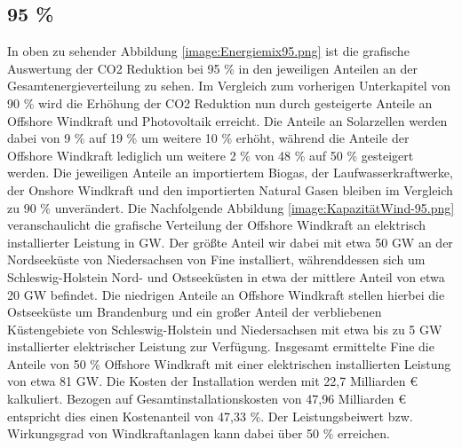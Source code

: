 \subsection{95 \%}


In oben zu sehender Abbildung \ref{image:Energiemix95.png} ist die grafische Auswertung der CO2 Reduktion bei 95 \% in den jeweiligen Anteilen an der Gesamtenergieverteilung zu sehen. Im Vergleich zum vorherigen Unterkapitel von 90 \% wird die Erhöhung der CO2 Reduktion nun durch gesteigerte Anteile an Offshore Windkraft und Photovoltaik erreicht. Die Anteile an Solarzellen werden dabei von 9 \% auf 19 \% um weitere 10 \% erhöht, während die Anteile der Offshore Windkraft lediglich um weitere 2 \% von 48 \% auf 50 \% gesteigert werden. Die jeweiligen Anteile an importiertem Biogas, der Laufwasserkraftwerke, der Onshore Windkraft und den importierten Natural Gasen bleiben im Vergleich zu 90 \% unverändert. 
Die Nachfolgende Abbildung \ref{image:KapazitätWind-95.png} veranschaulicht die grafische Verteilung der Offshore Windkraft an elektrisch installierter Leistung in GW. 
Der größte Anteil wir dabei mit etwa 50 GW an der Nordseeküste von Niedersachsen von Fine installiert, währenddessen sich um Schleswig-Holstein Nord- und Ostseeküsten in etwa der mittlere Anteil von etwa 20 GW befindet. 
Die niedrigen Anteile an Offshore Windkraft stellen hierbei die Ostseeküste um Brandenburg und ein großer Anteil der verbliebenen Küstengebiete von Schleswig-Holstein und Niedersachsen mit etwa bis zu 5 GW installierter elektrischer Leistung zur Verfügung. 
Insgesamt ermittelte Fine die Anteile von 50 \% Offshore Windkraft mit einer elektrischen installierten Leistung von etwa 81 GW. Die Kosten der Installation werden mit 22,7 Milliarden € kalkuliert. Bezogen auf Gesamtinstallationskosten von 47,96 Milliarden € entspricht dies einen Kostenanteil von 47,33  \%. 
Der Leistungsbeiwert bzw. Wirkungsgrad von Windkraftanlagen kann dabei über 50 \% erreichen. \cite{ag_2021} 


